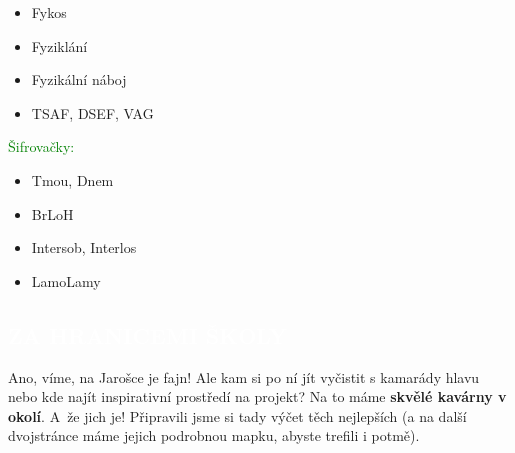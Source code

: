 \documentclass{article}
\newcommand{\nadpisy}[1]{
\vspace*{-60pt}
  \begin{nadpisboxy}
    \vspace*{20pt}
    \centering \section*{\textcolor{white}{#1}}
  \end{nadpisboxy}
}
\begin{document}
\begin{multicols}{3}
\begin{itemize}[leftmargin=10pt]
        \item Fykos
        \item Fyziklání
        \item Fyzikální náboj
        \item TSAF, DSEF, VAG
      \end{itemize}
      \textcolor{green}{Šifrovačky:}
      \begin{itemize}[leftmargin=10pt]
        \item Tmou, Dnem
        \item BrLoH
        \item Intersob, Interlos
        \item LamoLamy
      \end{itemize}
      \vspace*{1em}
\end{multicols}

\normalsize
\pagebreak

\nadpisy{ZA HRANICEMI ŠKOLY}
\enlargethispage{\pagegoal}
\noindent \small Ano, víme, na Jarošce je fajn! Ale kam si po ní jít vyčistit s kamarády hlavu nebo kde najít inspirativní prostředí na projekt? Na to máme \textbf{skvělé kavárny v okolí}. A~že jich je! Připravili jsme si tady výčet těch nejlepších (a na další dvojstránce máme jejich podrobnou mapku, abyste trefili i potmě).\\
\end{document}

